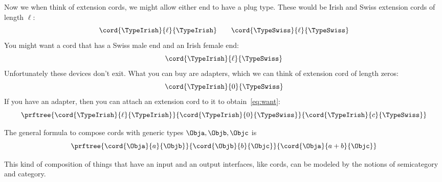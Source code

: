 Now we when think of extension cords, we might allow either end to have a plug type. 
% 
These would be Irish and Swiss  extension cords of length $\ell$:
% 
\begin{equation}
  \cord{\TypeIrish}{\ell}{\TypeIrish} \qquad \cord{\TypeSwiss}{\ell}{\TypeSwiss}
\end{equation}
% 
You might want a cord that has a Swiss male end and an Irish female end:
% 
\begin{equation}\label{eq:want}
  \cord{\TypeIrish}{\ell}{\TypeSwiss}
\end{equation}
% 
Unfortunately these devices don't exit. 
What you can buy are adapters, which we can think of extension cord of length zeros:
\begin{equation}
  \cord{\TypeIrish}{0}{\TypeSwiss}
\end{equation}
% 
If you have an adapter, then you can attach an extension cord to it to obtain~\cref{eq:want}:
% 
\begin{equation}
  \label{eq:irish-swiss-result}
  \prftree{\cord{\TypeIrish}{\ell}{\TypeIrish}}{\cord{\TypeIrish}{0}{\TypeSwiss}}{\cord{\TypeIrish}{c}{\TypeSwiss}}
\end{equation}

The general formula to compose cords with generic types $\Obja, \Objb, \Objc$ is 
\begin{equation}
  \label{eq:cords-generic}
  \prftree{\cord{\Obja}{a}{\Objb}}{\cord{\Objb}{b}{\Objc}}{\cord{\Obja}{a+b}{\Objc}}
\end{equation}

This kind of composition of things that have an input and an output interfaces, like cords, can be modeled by the notions of semicategory and category.




% 

%
%
%


